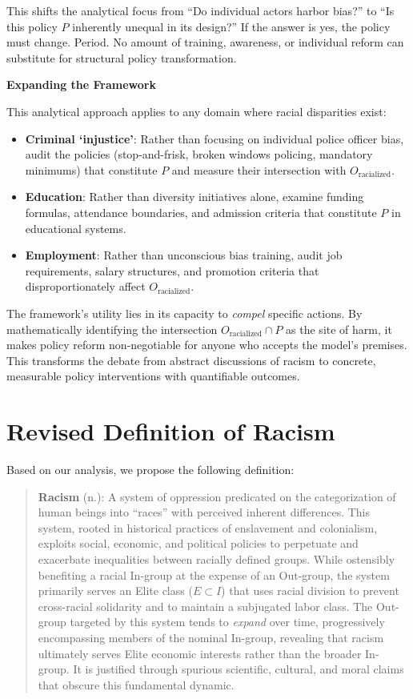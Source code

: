 \documentclass[12pt]{article}
\begin{document}
This shifts the analytical focus from ``Do individual actors harbor bias?'' to ``Is this policy $P$ inherently unequal in its design?'' If the answer is yes, the policy must change. Period. No amount of training, awareness, or individual reform can substitute for structural policy transformation.

\textbf{Expanding the Framework}

This analytical approach applies to any domain where racial disparities exist:
\begin{itemize}
    \item \textbf{Criminal `injustice'}: Rather than focusing on individual police officer bias, audit the policies (stop-and-frisk, broken windows policing, mandatory minimums) that constitute $P$ and measure their intersection with $O_{\text{racialized}}$.
    \item \textbf{Education}: Rather than diversity initiatives alone, examine funding formulas, attendance boundaries, and admission criteria that constitute $P$ in educational systems.
    \item \textbf{Employment}: Rather than unconscious bias training, audit job requirements, salary structures, and promotion criteria that disproportionately affect $O_{\text{racialized}}$.
\end{itemize}

The framework's utility lies in its capacity to \textit{compel} specific actions. By mathematically identifying the intersection $O_{\text{racialized}} \cap P$ as the site of harm, it makes policy reform non-negotiable for anyone who accepts the model's premises. This transforms the debate from abstract discussions of racism to concrete, measurable policy interventions with quantifiable outcomes.

\section{Revised Definition of Racism}

Based on our analysis, we propose the following definition:

\begin{quote}
\textbf{Racism} (n.): A system of oppression predicated on the categorization of human beings into ``races'' with perceived inherent differences. This system, rooted in historical practices of enslavement and colonialism, exploits social, economic, and political policies to perpetuate and exacerbate inequalities between racially defined groups. While ostensibly benefiting a racial In-group at the expense of an Out-group, the system primarily serves an Elite class ($E \subset I$) that uses racial division to prevent cross-racial solidarity and to maintain a subjugated labor class. The Out-group targeted by this system tends to \textit{expand} over time, progressively encompassing members of the nominal In-group, revealing that racism ultimately serves Elite economic interests rather than the broader In-group. It is justified through spurious scientific, cultural, and moral claims that obscure this fundamental dynamic.
\end{quote}
\end{document}
